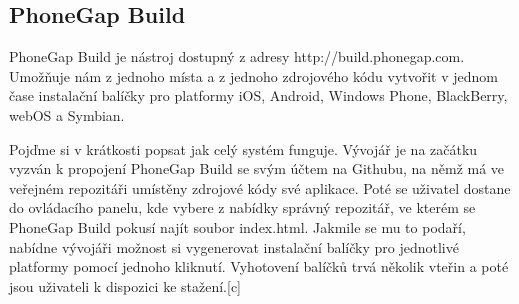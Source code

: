 \subsection{PhoneGap Build}
PhoneGap Build je nástroj dostupný z adresy http://build.phonegap.com. Umožňuje nám z jednoho místa a z jednoho zdrojového kódu vytvořit v jednom čase instalační balíčky pro platformy iOS, Android, Windows Phone, BlackBerry, webOS a Symbian.

Pojďme si v krátkosti popsat jak celý systém funguje. Vývojář je na začátku vyzván k propojení PhoneGap Build se svým účtem na Githubu, na němž má ve veřejném repozitáři umístěny zdrojové kódy své aplikace. Poté se uživatel dostane do ovládacího panelu, kde vybere z nabídky správný repozitář, ve kterém se PhoneGap Build pokusí najít soubor index.html. Jakmile se mu to podaří, nabídne vývojáři možnost si vygenerovat instalační balíčky pro jednotlivé platformy pomocí jednoho kliknutí. Vyhotovení balíčků trvá několik vteřin a poté jsou uživateli k dispozici ke stažení.[c]


